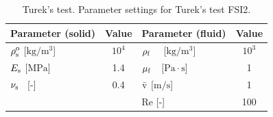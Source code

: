 \documentclass[11pt,english]{article}
\def\denssolid{\rho_{\rm{s}}^{\rm{o}}}  %
\def\nusolid{\nu_{\rm{s}}}              %
\def\Esolid{E_{\rm{s}}}                 %
\def\densfluid{\rho_{\rm{f}}}                %
\def\viscfluid{\mu_{\rm{f}}}                 %
\begin{document}
\begin{table}[h]
    \centering
    \begin{tabular}{l c | l c}
        \toprule
        \textbf{Parameter (solid)} & \textbf{Value} & \textbf{Parameter (fluid)} & \textbf{Value} \\
        \midrule
        $\denssolid$ {[}$\mathrm{kg/m^3}${]} & $10^4$ & $\densfluid$ ~~{[}$\mathrm{kg/m^3}${]} & $10^3$ \\
        $\Esolid$ {[}$\mathrm{MPa}${]} & 1.4 & $\viscfluid$ ~\,{[}$\mathrm{Pa}\cdot \mathrm{s}${]} & 1 \\
        $\nusolid$ ~{[}-{]} & 0.4 & $\bar{\rm{v}}$ {[}$\mathrm{m/s}${]} & 1 \\
        & & $\mathrm{Re}$ {[-]} & 100 \\
        \bottomrule
    \end{tabular}
    \caption{Turek's test. Parameter settings for Turek's test FSI2.}
    \label{fig:turek_parameter_settings}
\end{table}

\end{document}
